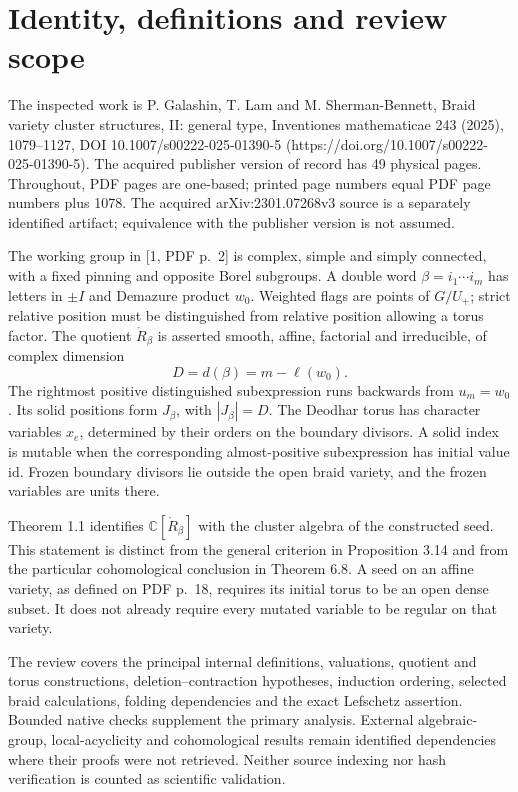 \documentclass[10pt]{article}
\begin{document}
\section*{Identity, definitions and review scope}
The inspected work is P. Galashin, T. Lam and M. Sherman-Bennett, Braid variety cluster structures, II: general type, Inventiones mathematicae 243 (2025), 1079–1127, DOI 10.1007/s00222-025-01390-5 (https://doi.org/10.1007/s00222-025-01390-5). The acquired publisher version of record has 49 physical pages. Throughout, PDF pages are one-based; printed page numbers equal PDF page numbers plus 1078. The acquired arXiv:2301.07268v3 source is a separately identified artifact; equivalence with the publisher version is not assumed.\par
The working group in [1, PDF p. 2] is complex, simple and simply connected, with a fixed pinning and opposite Borel subgroups. A double word \(\beta=i_1\cdots i_m\) has letters in \(\pm I\) and Demazure product \(w_0\). Weighted flags are points of \(G/U_+\); strict relative position must be distinguished from relative position allowing a torus factor. The quotient \(\mathring R_\beta\) is asserted smooth, affine, factorial and irreducible, of complex dimension \[D=d(\beta)=m-\ell(w_0).\] The rightmost positive distinguished subexpression runs backwards from \(u_m=w_0\). Its solid positions form \(J_\beta\), with \(|J_\beta|=D\). The Deodhar torus has character variables \(x_e\), determined by their orders on the boundary divisors. A solid index is mutable when the corresponding almost-positive subexpression has initial value \(\mathrm{id}\). Frozen boundary divisors lie outside the open braid variety, and the frozen variables are units there.\par
Theorem 1.1 identifies \(\mathbb C[\mathring R_\beta]\) with the cluster algebra of the constructed seed. This statement is distinct from the general criterion in Proposition 3.14 and from the particular cohomological conclusion in Theorem 6.8. A seed on an affine variety, as defined on PDF p. 18, requires its initial torus to be an open dense subset. It does not already require every mutated variable to be regular on that variety.\par
The review covers the principal internal definitions, valuations, quotient and torus constructions, deletion–contraction hypotheses, induction ordering, selected braid calculations, folding dependencies and the exact Lefschetz assertion. Bounded native checks supplement the primary analysis. External algebraic-group, local-acyclicity and cohomological results remain identified dependencies where their proofs were not retrieved. Neither source indexing nor hash verification is counted as scientific validation.\par
\end{document}
